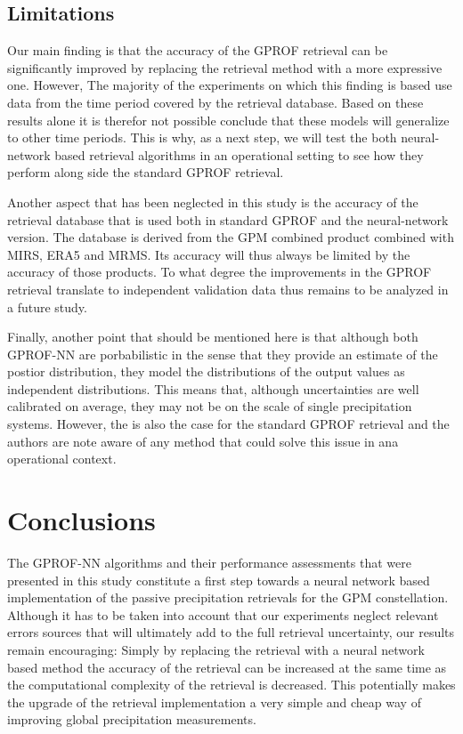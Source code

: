 \documentclass[a4paper,11pt,bibtotoc]{scrartcl}
\begin{document}
\subsection{Limitations}

Our main finding is that the accuracy of the GPROF retrieval can be
significantly improved by replacing the retrieval method with a more expressive
one. However, The majority of the experiments on which this finding is based use
data from the time period covered by the retrieval database. Based on these
results alone it is therefor not possible conclude that these models will
generalize to other time periods. This is why, as a next step, we will test the
both neural-network based retrieval algorithms in an operational setting to see
how they perform along side the standard GPROF retrieval.

Another aspect that has been neglected in this study is the accuracy of the
retrieval database that is used both in standard GPROF and the neural-network
version. The database is derived from the GPM combined product combined with
MIRS, ERA5 and MRMS. Its accuracy will thus always be limited by the accuracy of
those products. To what degree the improvements in the GPROF retrieval translate
to independent validation data thus remains to be analyzed in a future study.

Finally, another point that should be mentioned here is that although both
GPROF-NN are porbabilistic in the sense that they provide an estimate of
the postior distribution, they model the distributions of the output values
as independent distributions. This means that, although uncertainties are
well calibrated on average, they may not be on the scale of single
precipitation systems. However, the is also the case for the standard
GPROF retrieval and the authors are note aware of any method that could solve
this issue in ana operational context.

\section{Conclusions}

The GPROF-NN algorithms and their performance assessments that were presented in
this study constitute a first step towards a neural network based implementation
of the passive precipitation retrievals for the GPM constellation. Although it
has to be taken into account that our experiments neglect relevant errors
sources that will ultimately add to the full retrieval uncertainty, our results
remain encouraging: Simply by replacing the retrieval with a neural network
based method the accuracy of the retrieval can be increased at the same time as
the computational complexity of the retrieval is decreased. This potentially
makes the upgrade of the retrieval implementation a very simple and cheap way
of improving global precipitation measurements.
\end{document}
